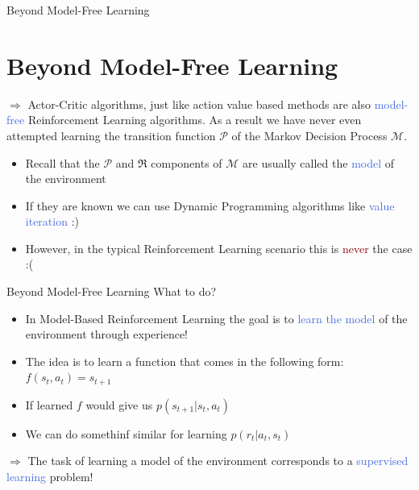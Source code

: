 \documentclass{beamer}
\begin{document}
\begin{frame}{Beyond Model-Free Learning}
	\section{Beyond Model-Free Learning}

	$\Rightarrow$ Actor-Critic algorithms, just like action value based methods are also \textcolor{RoyalBlue}{model-free} Reinforcement Learning algorithms.
	As a result we have never even attempted learning the transition function $\mathcal{P}$ of the Markov Decision Process $\mathcal{M}$.

	\bigskip

	\begin{itemize}
		\item Recall that the $\mathcal{P}$ and $\Re$ components of $\mathcal{M}$ are usually called the \textcolor{RoyalBlue}{model} of the environment
		\item If they are known we can use Dynamic Programming algorithms like \textcolor{RoyalBlue}{value iteration} :)
		\item However, in the typical Reinforcement Learning scenario this is \textcolor{Maroon}{never} the case :(
	\end{itemize}


\end{frame}


\begin{frame}{Beyond Model-Free Learning}
	What to do?

	\begin{itemize}
		\item In Model-Based Reinforcement Learning the goal is to \textcolor{RoyalBlue}{learn the model} of the environment through experience!
		\item The \textcolor{skymagenta}{idea} is to learn a function that comes in the following form: $f(s_t,a_t) = s_{t+1}$
		\item If learned $f$ would give us $p(s_{t+1}|s_t,a_t)$
		\item We can do somethinf similar for learning $p(r_t|a_t,s_t)$
	\end{itemize}
	
	\bigskip
	
	$\Rightarrow$ The task of learning a model of the environment corresponds to a \textcolor{RoyalBlue}{supervised learning} problem!

\end{frame}
\end{document}
